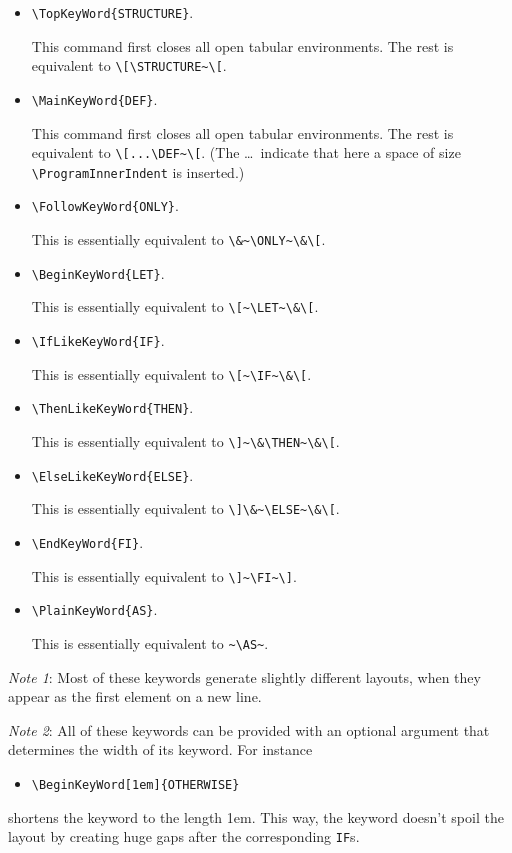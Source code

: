 \begin{itemize}
  \item \verb+\TopKeyWord{STRUCTURE}+.
    
    This command first closes all open tabular environments. The rest is
    equivalent to \verb+\[\STRUCTURE~\[+. %

  \item \verb+\MainKeyWord{DEF}+.
    
    This command first closes all open tabular environments. The rest is
    equivalent to \verb+\[...\DEF~\[+. (The \ldots~indicate that here a  %
    space of size \verb+\ProgramInnerIndent+ is inserted.)

  \item \verb+\FollowKeyWord{ONLY}+.
    
    This is essentially equivalent to \verb+\&~\ONLY~\&\[+.  %

  \item \verb+\BeginKeyWord{LET}+.
    
    This is essentially equivalent to \verb+\[~\LET~\&\[+.   %

  \item \verb+\IfLikeKeyWord{IF}+.
    
    This is essentially equivalent to \verb+\[~\IF~\&\[+.   %

  \item \verb+\ThenLikeKeyWord{THEN}+.
    
    This is essentially equivalent to \verb+\]~\&\THEN~\&\[+.   %

  \item \verb+\ElseLikeKeyWord{ELSE}+.
    
    This is essentially equivalent to \verb+\]\&~\ELSE~\&\[+.   %

  \item \verb+\EndKeyWord{FI}+.
    
    This is essentially equivalent to \verb+\]~\FI~\]+.

  \item \verb+\PlainKeyWord{AS}+.
    
    This is essentially equivalent to \verb+~\AS~+.

\end{itemize}

\emph{Note 1}: Most of these keywords generate slightly different layouts,
when they appear as the first element on a new line.

\emph{Note 2}: All of these keywords can be provided with an optional
argument that determines the width of its keyword. For instance
\begin{itemize}
  \item \verb+\BeginKeyWord[1em]{OTHERWISE}+
\end{itemize}
shortens the keyword to the length 1em. This way, the keyword doesn't spoil
the layout by creating huge gaps after the corresponding \texttt{IF}s.

